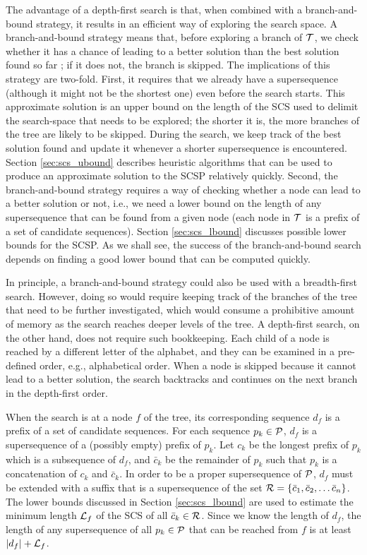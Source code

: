 The advantage of a depth-first search is that, when combined with a
branch-and-bound strategy, it results in an efficient way of exploring the
search space. A branch-and-bound strategy means that, before exploring a branch
of ${\mathcal{T}}$, we check whether it has a chance of leading to a better solution
than the best solution found so far \citep{Horowitz1996}; if it does not, the
branch is skipped. The implications of this strategy are two-fold. First, it
requires that we already have a supersequence (although it might not be the
shortest one) even before the search starts. This approximate solution is an
upper bound on the length of the SCS used to delimit the search-space that needs
to be explored; the shorter it is, the more branches of the tree are likely to
be skipped. During the search, we keep track of the best solution found and
update it whenever a shorter supersequence is encountered. Section
\ref{sec:scs_ubound} describes heuristic algorithms that can be used to produce
an approximate solution to the SCSP relatively quickly. Second, the
branch-and-bound strategy requires a way of checking whether a node can lead to
a better solution or not, i.e., we need a lower bound on the length of any
supersequence that can be found from a given node (each node in ${\mathcal{T}}$ is a
prefix of a set of candidate sequences). Section \ref{sec:scs_lbound}
discusses possible lower bounds for the SCSP. As we shall see, the success of the
branch-and-bound search depends on finding a good lower bound that can be
computed quickly.

In principle, a branch-and-bound strategy could also be used with a
breadth-first search. However, doing so would require keeping track of the
branches of the tree that need to be further investigated, which would consume a
prohibitive amount of memory as the search reaches deeper levels of the tree.
A depth-first search, on the other hand, does not require such bookkeeping. Each
child of a node is reached by a different letter of the alphabet, and they can
be examined in a pre-defined order, e.g., alphabetical order. When a node is
skipped because it cannot lead to a better solution, the search backtracks and
continues on the next branch in the depth-first order.

When the search is at a node $f$ of the tree, its corresponding sequence $d_f$
is a prefix of a set of candidate sequences. For each sequence
$p_k \in {\mathcal{P}}$, $d_f$ is a supersequence of a (possibly empty) prefix of $p_k$.
Let $c_k$ be the longest prefix of $p_k$ which is a subsequence of $d_f$, and
$\bar{c}_k$ be the remainder of $p_k$ such that $p_k$ is a
concatenation of $c_k$ and $\bar{c}_k$. In order to be a proper supersequence of
${\mathcal{P}}$, $d_f$ must be extended with a suffix that is a supersequence of the set
${\mathcal{R}} = \{\bar{c}_1, \bar{c}_2, \ldots \bar{c}_n\}$. The lower bounds discussed
in Section \ref{sec:scs_lbound} are used to estimate the minimum length ${\mathcal{L}}_f$ of
the SCS of all $\bar{c}_k \in {\mathcal{R}}$. Since we know the length of $d_f$, the
length of any supersequence of all $p_k \in {\mathcal{P}}$ that can be reached from $f$
is at least $|d_f| + {\mathcal{L}}_f$.

